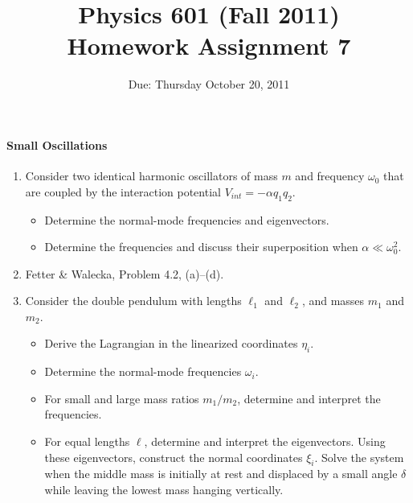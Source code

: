 \documentclass[letterpaper,11pt]{article}
\title{Physics 601 (Fall 2011) \\ Homework Assignment 7}
\date{Due: Thursday October 20, 2011}
\begin{document}
\maketitle

\paragraph*{Small Oscillations}
\begin{enumerate}
 \item Consider two identical harmonic oscillators of mass $m$ and frequency $\omega_0$ that are coupled by the interaction potential $V_{int} = -\alpha q_1 q_2$.
 \begin{itemize}
  \item Determine the normal-mode frequencies and eigenvectors.
  \item Determine the frequencies and discuss their superposition when $\alpha \ll \omega_0^2$.
 \end{itemize}
 \item Fetter \& Walecka, Problem 4.2, (a)--(d).
 \item Consider the double pendulum with lengths $\ell_1$ and $\ell_2$, and masses $m_1$ and $m_2$.
 \begin{itemize}
  \item Derive the Lagrangian in the linearized coordinates $\eta_i$.
  \item Determine the normal-mode frequencies $\omega_i$.
  \item For small and large mass ratios $m_1 / m_2$, determine and interpret the frequencies.
  \item For equal lengths $\ell$, determine and interpret the eigenvectors.  Using these eigenvectors, construct the normal coordinates $\xi_i$.  Solve the system when the middle mass is initially at rest and displaced by a small angle $\delta$ while leaving the lowest mass hanging vertically.
 \end{itemize}
\end{enumerate}
\end{document}
